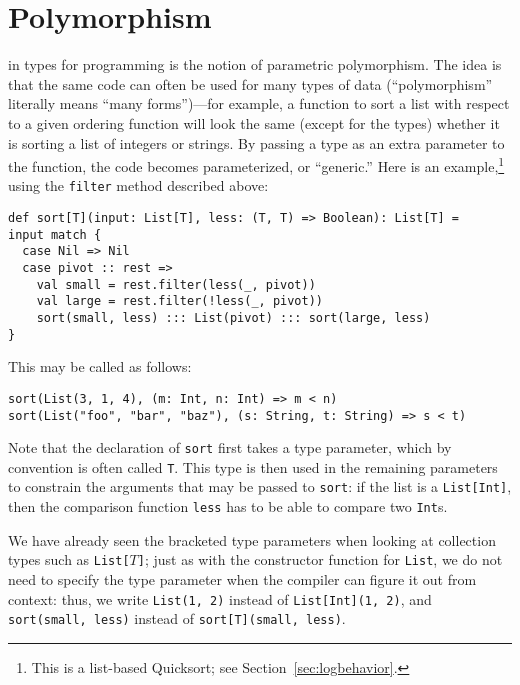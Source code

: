 \section{Polymorphism}
 in types for programming is the notion of parametric polymorphism. The idea is that the same code can often be used for many types of data (``polymorphism'' literally means ``many forms'')---for example, a function to sort a list with respect to a given ordering function will look the same (except for the types) whether it is sorting a list of integers or strings. By passing a type as an extra parameter to the function, the code becomes parameterized, or ``generic.'' Here is an example,\footnote{This is a list-based Quicksort; see Section~\ref{sec:logbehavior}.} using the \verb|filter| method described above:
\begin{verbatim}
def sort[T](input: List[T], less: (T, T) => Boolean): List[T] =
input match {
  case Nil => Nil
  case pivot :: rest =>
    val small = rest.filter(less(_, pivot))
    val large = rest.filter(!less(_, pivot))
    sort(small, less) ::: List(pivot) ::: sort(large, less)
}
\end{verbatim}
This may be called as follows:
\begin{verbatim}
sort(List(3, 1, 4), (m: Int, n: Int) => m < n)
sort(List("foo", "bar", "baz"), (s: String, t: String) => s < t)
\end{verbatim}

Note that the declaration of \verb|sort| first takes a type parameter, which by convention is often called \verb|T|. This type is then used in the remaining parameters to constrain the arguments that may be passed to \verb|sort|: if the list is a \verb|List[Int]|, then the comparison function \verb|less| has to be able to compare two \verb|Int|s.

We have already seen the bracketed type parameters when looking at collection types such as \texttt{List[$T$]}; just as with the constructor function for \verb|List|, we do not need to specify the type parameter when the compiler can figure it out from context: thus, we write \verb|List(1, 2)| instead of \verb|List[Int](1, 2)|, and \verb|sort(small, less)| instead of \verb|sort[T](small, less)|.


